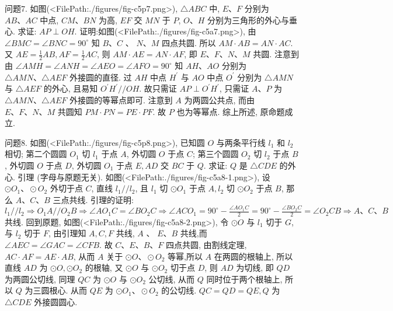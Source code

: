 问题7. 如图(<FilePath:./figures/fig-c5p7.png>), $\triangle A B C$ 中, $E 、 F$ 分别为 $A B 、 A C$ 中点, $C M 、 B N$ 为高, $E F$ 交 $M N$ 于 $P$, $O 、 H$ 分别为三角形的外心与垂心.
求证: $A P \perp O H$.
证明:如图(<FilePath:./figures/fig-c5a7.png>), 由 $\angle B M C=\angle B N C=90^{\circ}$ 知 $B 、 C$ 、 $N 、 M$ 四点共圆.
所以 $A M \cdot A B=A N \cdot A C$. 又 $A E=\frac{1}{2} A B, A F=\frac{1}{2} A C$, 则 $A M \cdot A E=A N \cdot A F$, 即 $E 、 F 、 N 、 M$ 共圆.
注意到由 $\angle A M H= \angle A N H=\angle A E O=\angle A F O=90^{\circ}$ 知 $A H 、 A O$ 分别为 $\triangle A M N 、 \triangle A E F$ 外接圆的直径.
过 $A H$ 中点 $H^{\prime}$ 与 $A O$ 中点 $O^{\prime}$ 分别为 $\triangle A M N$ 与 $\triangle A E F$ 的外心, 且易知 $O^{\prime} H^{\prime} / / O H$. 故只需证 $A P \perp O^{\prime} H^{\prime}$, 只需证 $A 、 P$ 为 $\triangle A M N 、 \triangle A E F$ 外接圆的等幂点即可.
注意到 $A$ 为两圆公共点, 而由 $E 、 F 、 N 、 M$ 共圆知 $P M \cdot P N=P E \cdot P F$. 故 $P$ 也为等幂点.
综上所述, 原命题成立.



问题8. 如图(<FilePath:./figures/fig-c5p8.png>), 已知圆 $O$ 与两条平行线 $l_1$ 和 $l_2$ 相切; 第二个圆圆 $O_1$ 切 $l_1$ 于点 $A$, 外切圆 $O$ 于点 $C$; 第三个圆圆 $O_2$ 切 $l_2$ 于点 $B$, 外切圆 $O$ 于点 $D$, 外切圆 $O_1$ 于点 $E, A D$ 交 $B C$ 于 $Q$. 求证: $Q$ 是 $\triangle C D E$ 的外心.
引理 (字母与原题无关). 如图(<FilePath:./figures/fig-c5a8-1.png>), 设 $\odot O_1 、 \odot O_2$ 外切于点 $C$, 直线 $l_1 / / l_2$, 且 $l_1$ 切 $\odot O_1$ 于点 $A, l_2$ 切 $\odot O_2$ 于点 $B$, 那么 $A 、 C 、 B$ 三点共线.
引理的证明: $l_1 / / l_2 \Rightarrow O_1 A / / O_2 B \Rightarrow \angle A O_1 C=\angle B O_2 C \Rightarrow \angle A C O_1= 90^{\circ}-\frac{\angle A O_1 C}{2}=90^{\circ}-\frac{\angle B O_2 C}{2}=\angle O_2 C B \Rightarrow A 、 C 、 B$ 共线.
回到原题, 如图(<FilePath:./figures/fig-c5a8-2.png>), 令 $\odot O$ 与 $l_1$ 切于 $G$, 与 $l_2$ 切于 $F$, 由引理知 $A, C, F$ 共线, $A$ 、 $E 、 B$ 共线,而 $\angle A E C=\angle G A C=\angle C F B$. 故 $C 、 E 、 B 、 F$ 四点共圆, 由割线定理, $A C \cdot A F=A E \cdot A B$, 从而 $A$ 关于 $\odot O 、 \odot O_2$ 等幂,所以 $A$ 在两圆的根轴上, 所以直线 $A D$ 为 $\odot O, \odot O_2$ 的根轴, 又 $\odot O$ 与 $\odot O_2$ 切于点 $D$, 则 $A D$ 为切线, 即 $Q D$ 为两圆公切线, 同理 $Q C$ 为 $\odot O$ 与 $\odot O_2$ 公切线, 从而 $Q$ 同时位于两个根轴上, 所以 $Q$ 为三圆根心.
从而 $Q E$ 为 $\odot O_1 、 \odot O_2$ 的公切线.
$Q C= Q D=Q E, Q$ 为 $\triangle C D E$ 外接圆圆心.



